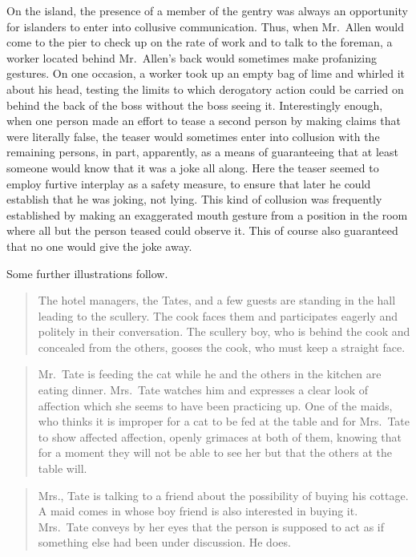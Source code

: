 \documentclass[openany,nobib]{tufte-book}
\begin{document}
On the island, the presence of a member of the gentry was always an
opportunity for islanders to enter into collusive communication. Thus,
when Mr.~Allen would come to the pier to check up on the rate of work
and to talk to the foreman, a worker located behind Mr.~Allen's back
would sometimes make profanizing gestures. On one occasion, a worker
took up an empty bag of lime and whirled it about his head, testing the
limits to which derogatory action could be carried on behind the back of
the boss without the boss seeing it. Interestingly enough, when one
person made an effort to tease a second person by making claims that
were literally false, the teaser would sometimes enter into collusion
with the remaining persons, in part, apparently, as a means of
guaranteeing that at least someone would know that it was a joke all
along. Here the teaser seemed to employ furtive interplay as a safety
measure, to ensure that later he could establish that he was joking, not
lying. This kind of collusion was frequently established by making an
exaggerated mouth gesture from a position in the room where all but the
person teased could observe it. This of course also guaranteed that no
one would give the joke away.

Some further illustrations follow.

\begin{quote}
The hotel managers, the Tates, and a few guests are standing in the hall
leading to the scullery. The cook faces them and participates eagerly
and politely in their conversation. The scullery boy, who is behind the
cook and concealed from the others, gooses the cook, who must keep a
straight face.
\end{quote}

\begin{quote}
Mr.~Tate is feeding the cat while he and the others in the kitchen are
eating dinner. Mrs.~Tate watches him and expresses a clear look of
affection which she seems to have been practicing up. One of the maids,
who thinks it is improper for a cat to be fed at the table and for
Mrs.~Tate to show affected affection, openly grimaces at both of them,
knowing that for a moment they will not be able to see her but that the
others at the table will.
\end{quote}

\begin{quote}
Mrs., Tate is talking to a friend about the possibility of buying his
cottage. A maid comes in whose boy friend is also interested in buying
it. Mrs.~Tate conveys by her eyes that the person is supposed to act as
if something else had been under discussion. He does.
\end{quote}
\end{document}
